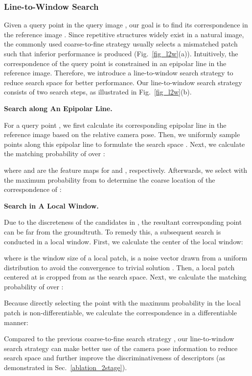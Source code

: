 \documentclass[10pt,twocolumn,letterpaper]{article}
\begin{document}
\subsubsection{Line-to-Window Search}
\label{text_method_desc_l2w}
Given a query point  in the query image , our goal is to find its correspondence in the reference image . 
Since repetitive structures widely exist in a natural image, the commonly used coarse-to-fine strategy \cite{wangLearningFeatureDescriptors2020, sunLoFTRDetectorFreeLocal2021} usually selects a mismatched patch such that inferior performance is produced (Fig.~\ref{fig_l2w}(a)). 
Intuitively, the correspondence of the query point  is constrained in an epipolar line in the reference image. Therefore, we introduce a line-to-window search strategy to reduce search space for better performance. Our line-to-window search strategy consists of two search steps, as illustrated in Fig.~\ref{fig_l2w}(b).

\noindent \textbf{Search along An Epipolar Line.}

For a query point , we first calculate its corresponding epipolar line  in the reference image  based on the relative camera pose. Then, we uniformly sample  points along this epipolar line to formulate the search space .
Next, we calculate the matching probability of  over :
 
where  and  are the feature maps for  and , respectively. Afterwards, we select  with the maximum probability from  to determine the coarse location of the correspondence of : 



\noindent \textbf{Search in A Local Window.}

Due to the discreteness of the candidates in , the resultant corresponding point  can be far from the groundtruth. To remedy this, a subsequent search is conducted in a local window. First, we calculate the center of the local window:

where  is the window size of a local patch,  is a noise vector drawn from a uniform distribution  to avoid the convergence to trivial solution .
Then, a local patch  centered at  is cropped from  as the search space. Next, we calculate the matching probability of  over :
 
Because directly selecting the point with the maximum probability in the local patch is non-differentiable, we calculate the correspondence  in a differentiable manner:



Compared to the previous coarse-to-fine search strategy \cite{wangLearningFeatureDescriptors2020}, our line-to-window search strategy can make better use of the camera pose information to reduce search space and further improve the discriminativeness of descriptors (as demonstrated in Sec.~\ref{ablation_2stage}). 
\end{document}
